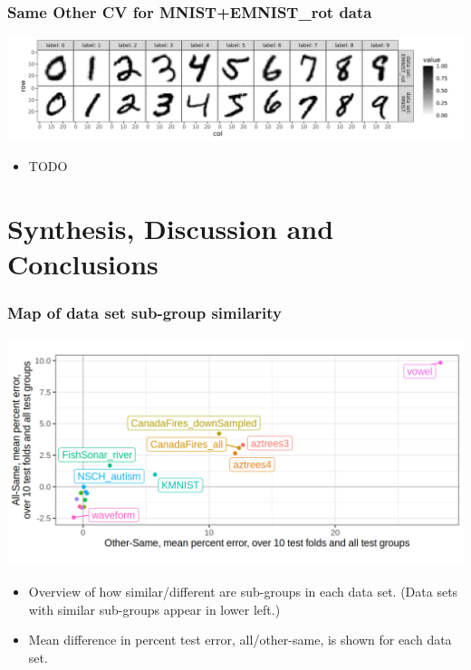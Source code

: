 \documentclass{beamer}
\begin{document}
\begin{frame}
  \frametitle{Same Other CV for MNIST+EMNIST\_rot data}

  \includegraphics[width=\textwidth]{data_Classif_MNIST_other_EMNIST_rot.png}
  
  \begin{itemize}
  \item TODO
  \end{itemize}
\end{frame}

\section{Synthesis, Discussion and Conclusions}

\begin{frame}
  \frametitle{Map of data set sub-group similarity}
  \includegraphics[width=\textwidth]{data_Classif_batchmark_registry_scatter_other_all.png}
  \begin{itemize}
  \item Overview of how similar/different are sub-groups in each data set. (Data sets with similar sub-groups appear in lower left.)
  \item Mean difference in percent test error, all/other-same, is
    shown for each data set.
  \end{itemize}
\end{frame}
\end{document}
